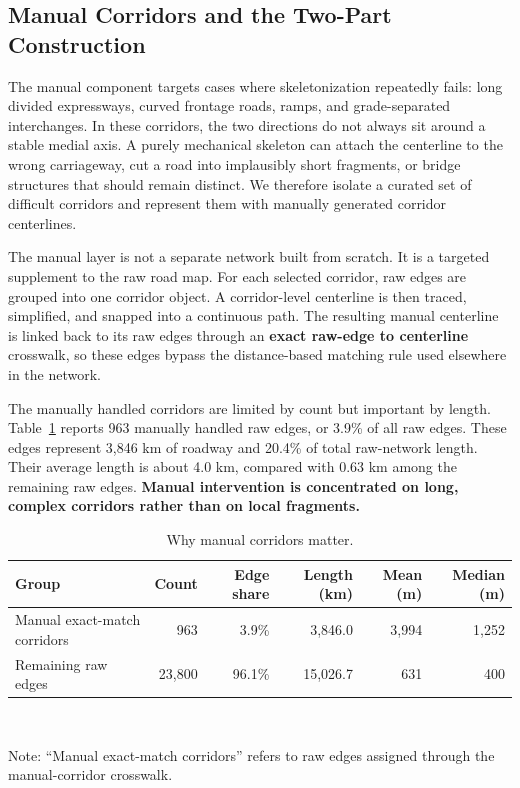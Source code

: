 \documentclass[12pt]{article}
\begin{document}
	\subsection{Manual Corridors and the Two-Part Construction}

	The manual component targets cases where skeletonization repeatedly fails: long divided expressways, curved frontage roads, ramps, and grade-separated interchanges. In these corridors, the two directions do not always sit around a stable medial axis. A purely mechanical skeleton can attach the centerline to the wrong carriageway, cut a road into implausibly short fragments, or bridge structures that should remain distinct. We therefore isolate a curated set of difficult corridors and represent them with manually generated corridor centerlines.

	The manual layer is not a separate network built from scratch. It is a targeted supplement to the raw road map. For each selected corridor, raw edges are grouped into one corridor object. A corridor-level centerline is then traced, simplified, and snapped into a continuous path. The resulting manual centerline is linked back to its raw edges through an \textbf{exact raw-edge to centerline} crosswalk, so these edges bypass the distance-based matching rule used elsewhere in the network.
	
	The manually handled corridors are limited by count but important by length. Table~\ref{tab:manual-corridor-summary} reports 963 manually handled raw edges, or 3.9\% of all raw edges. These edges represent 3,846 km of roadway and 20.4\% of total raw-network length. Their average length is about 4.0 km, compared with 0.63 km among the remaining raw edges. \textbf{Manual intervention is concentrated on long, complex corridors rather than on local fragments.}
	
	\begin{table}[h!]
		\centering
		\caption{Why manual corridors matter.}
		\label{tab:manual-corridor-summary}
		\begin{tabularx}{\textwidth}{>{\raggedright\arraybackslash}X r r r r r}
			\toprule
			Group & Count & Edge share & Length (km) & Mean (m) & Median (m) \\
			\midrule
			Manual exact-match corridors & 963 & 3.9\% & 3,846.0 & 3,994 & 1,252 \\
			Remaining raw edges & 23,800 & 96.1\% & 15,026.7 & 631 & 400 \\
			\bottomrule
		\end{tabularx} \\
		\vspace{0.3em}
		\begin{minipage}{\textwidth}
			\footnotesize
			\raggedright
			Note: ``Manual exact-match corridors'' refers to raw edges assigned through the manual-corridor crosswalk.
		\end{minipage}
	\end{table}
	
\end{document}
